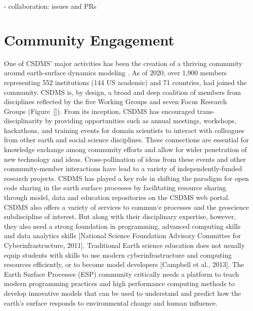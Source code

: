 \documentclass[12pt]{amsart}
\begin{document}
- collaboration: issues and PRs


\section{Community Engagement}
\label{sec:community}

One of CSDMS' major activities has been the creation of a thriving community around earth-surface dynamics modeling \citep{overeem2013strategies}. As of 2020, over 1,900 members representing 552 institutions (144 US academic) and 71 countries, had joined the community.  CSDMS is, by design, a broad and deep coalition of members from disciplines reflected by the five Working Groups and seven Focus Research Groups (Figure~\ref{}).  From its inception, CSDMS has encouraged trans-disciplinarity by providing opportunities such as annual meetings, workshops, hackathons, and training events for domain scientists to interact with colleagues from other earth and social science disciplines.  These connections are essential for knowledge exchange among community efforts and allow for wider penetration of new technology and ideas. Cross-pollination of ideas from these events and other community-member interactions have lead to a variety of independently-funded research projects. CSDMS has played a key role in shifting the paradigm for open code sharing in the earth surface processes by facilitating resource sharing through model, data and education repositories on the CSDMS web portal.  CSDMS also offers a variety of services to commun`e processes and the geoscience subdiscipline of interest.  But along with their disciplinary expertise, however, they also need a strong foundation in programming, advanced computing skills and data analytics skills [National Science Foundation Advisory Committee for Cyberinfrastructure, 2011].
Traditional Earth science education does not usually equip students with skills to use modern cyberinfrastructure and computing resources efficiently, or to become model developers [Campbell et al., 2013]. The Earth Surface Processes (ESP) community critically needs a platform to teach modern programming practices and high performance computing methods to develop innovative models that can be used to understand and predict how the earth’s surface responds to environmental change and human influence.
\end{document}
